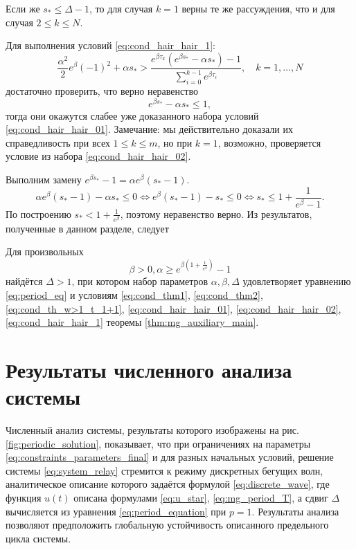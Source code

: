 Если же $s_* \leqslant \Delta - 1$, то для случая $k = 1$ верны те же рассуждения, что и для случая $2 \leqslant k \leqslant N$.

Для выполнения условий \eqref{eq:cond_hair_hair_1}:
\[
\frac{\alpha^2}{2}e^\beta(-1)^2+\alpha s_*>\frac{e^{\beta \tau_k}(e^{\beta s_*}-\alpha s_*)-1}{\sum_{i=0}^{k-1}e^{\beta \tau_i}},\quad k = 1,\ldots, N
\]
достаточно проверить, что верно неравенство
\[
e^{\beta s_*}-\alpha s_* \leqslant 1,
\]
тогда они окажутся слабее уже доказанного набора условий \eqref{eq:cond_hair_hair_01}. Замечание: мы действительно доказали их справедливость при всех $1 \leqslant k \leqslant m$, но при $k = 1$, возможно, проверяется условие из набора \eqref{eq:cond_hair_hair_02}.

Выполним замену $e^{\beta s_*} - 1 = \alpha e^\beta (s_* - 1)$.
%
\[
\alpha e^{\beta}(s_* - 1) - \alpha s_* \leqslant 0 \Leftrightarrow e^{\beta}(s_* - 1) - s_* \leqslant 0 \Leftrightarrow s_* \leqslant 1 + \frac{1}{e^{\beta} - 1}.
\]
%
По построению $s_* < 1 + \frac{1}{e^{\beta}}$, поэтому неравенство верно.
%
Из результатов, полученные в данном разделе, следует
%
\begin{theorem}
	\label{thm:relay_main}
	Для произвольных 
	\begin{equation}
		\label{eq:constraints_parameters_final}
		\beta > 0, \alpha \geq e^{\beta\left(1 + \frac{1}{e^{\beta}}\right)} - 1
	\end{equation}
	найдётся $\Delta > 1$, при котором набор параметров $\alpha, \beta, \Delta$ удовлетворяет уравнению \eqref{eq:period_eq} и условиям \eqref{eq:cond_thm1}, \eqref{eq:cond_thm2}, \eqref{eq:cond_th_w>1_t_1+1}, \eqref{eq:cond_hair_hair_01}, \eqref{eq:cond_hair_hair_02}, \eqref{eq:cond_hair_hair_1} теоремы \ref{thm:mg_auxiliary_main}.
\end{theorem}


\section{Результаты численного анализа системы}\label{sec:ch2/sect4}
%
Численный анализ системы, результаты которого изображены на рис. \ref{fig:periodic_solution}, показывает, что при ограничениях на параметры \eqref{eq:constraints_parameters_final} и для разных начальных условий, решение системы \eqref{eq:system_relay} стремится к режиму дискретных бегущих волн, аналитическое описание которого задаётся формулой \eqref{eq:discrete_wave}, где функция $u(t)$ описана формулами \eqref{eq:u_star}, \eqref{eq:mg_period_T}, а сдвиг $\Delta$ вычисляется из уравнения \eqref{eq:period_equation} при $p = 1$. Результаты анализа позволяют предположить глобальную устойчивость описанного предельного цикла системы.


